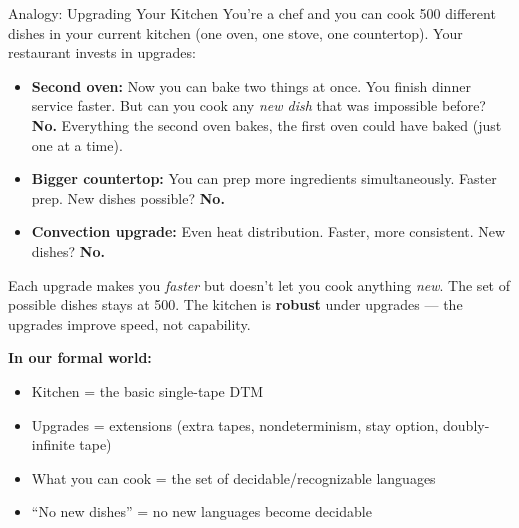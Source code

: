 \begin{notebox}{Analogy: Upgrading Your Kitchen}
You're a chef and you can cook 500 different dishes in your current kitchen
(one oven, one stove, one countertop). Your restaurant invests in upgrades:

\begin{itemize}[nosep]
\item \textbf{Second oven:} Now you can bake two things at once. You finish
  dinner service faster. But can you cook any \emph{new dish} that was
  impossible before? \textbf{No.} Everything the second oven bakes, the first
  oven could have baked (just one at a time).
\item \textbf{Bigger countertop:} You can prep more ingredients simultaneously.
  Faster prep. New dishes possible? \textbf{No.}
\item \textbf{Convection upgrade:} Even heat distribution. Faster, more
  consistent. New dishes? \textbf{No.}
\end{itemize}

Each upgrade makes you \emph{faster} but doesn't let you cook anything
\emph{new}. The set of possible dishes stays at 500. The kitchen is
\textbf{robust} under upgrades --- the upgrades improve speed, not capability.

\textbf{In our formal world:}
\begin{itemize}[nosep]
\item Kitchen = the basic single-tape DTM
\item Upgrades = extensions (extra tapes, nondeterminism, stay option,
  doubly-infinite tape)
\item What you can cook = the set of decidable/recognizable languages
\item ``No new dishes'' = no new languages become decidable
\end{itemize}
\end{notebox}

